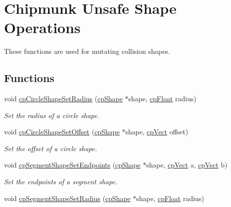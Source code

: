 \hypertarget{group__unsafe}{}\section{Chipmunk Unsafe Shape Operations}
\label{group__unsafe}


These functions are used for mutating collision shapes.  


\subsection*{Functions}
\begin{DoxyCompactItemize}
\item 
\hypertarget{group__unsafe_ga465d54119557ea9e323d3a0c27d05a76}{}void \hyperlink{group__unsafe_ga465d54119557ea9e323d3a0c27d05a76}{cp\+Circle\+Shape\+Set\+Radius} (\hyperlink{structcp_shape}{cp\+Shape} $\ast$shape, \hyperlink{group__basic_types_gac1ed65573e035bf892505768c852d8d3}{cp\+Float} radius)\label{group__unsafe_ga465d54119557ea9e323d3a0c27d05a76}

\begin{DoxyCompactList}\small\item\em Set the radius of a circle shape. \end{DoxyCompactList}\item 
\hypertarget{group__unsafe_gaa68bf4f38f35f823dc06131f3efb6990}{}void \hyperlink{group__unsafe_gaa68bf4f38f35f823dc06131f3efb6990}{cp\+Circle\+Shape\+Set\+Offset} (\hyperlink{structcp_shape}{cp\+Shape} $\ast$shape, \hyperlink{structcp_vect}{cp\+Vect} offset)\label{group__unsafe_gaa68bf4f38f35f823dc06131f3efb6990}

\begin{DoxyCompactList}\small\item\em Set the offset of a circle shape. \end{DoxyCompactList}\item 
\hypertarget{group__unsafe_ga793be86c47ec436816cb306fc6ba7fbe}{}void \hyperlink{group__unsafe_ga793be86c47ec436816cb306fc6ba7fbe}{cp\+Segment\+Shape\+Set\+Endpoints} (\hyperlink{structcp_shape}{cp\+Shape} $\ast$shape, \hyperlink{structcp_vect}{cp\+Vect} a, \hyperlink{structcp_vect}{cp\+Vect} b)\label{group__unsafe_ga793be86c47ec436816cb306fc6ba7fbe}

\begin{DoxyCompactList}\small\item\em Set the endpoints of a segment shape. \end{DoxyCompactList}\item 
\hypertarget{group__unsafe_ga26a6401be76f5299dfc029c54954ce04}{}void \hyperlink{group__unsafe_ga26a6401be76f5299dfc029c54954ce04}{cp\+Segment\+Shape\+Set\+Radius} (\hyperlink{structcp_shape}{cp\+Shape} $\ast$shape, \hyperlink{group__basic_types_gac1ed65573e035bf892505768c852d8d3}{cp\+Float} radius)\label{group__unsafe_ga26a6401be76f5299dfc029c54954ce04}


\end{DoxyCompactItemize}
